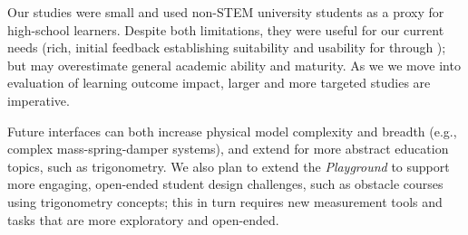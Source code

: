 Our studies were small and used non-STEM university students as a proxy for high-school learners.
Despite both limitations, they were useful for our current needs (rich, initial feedback establishing suitability and usability for \HandsOn through \SpringSim);  %
but may overestimate general academic ability and maturity.
As we we move into evaluation of learning outcome impact, larger and more targeted studies are imperative.

 

Future interfaces can both increase physical model complexity and breadth (e.g., complex mass-spring-damper systems), and extend \HandsOn for more abstract education topics, such as trigonometry. 
 We also plan to extend the \textit{Playground} to support more engaging, open-ended student design challenges, such as obstacle courses using trigonometry concepts; this in turn requires new measurement tools and tasks that are more exploratory and open-ended.
 

